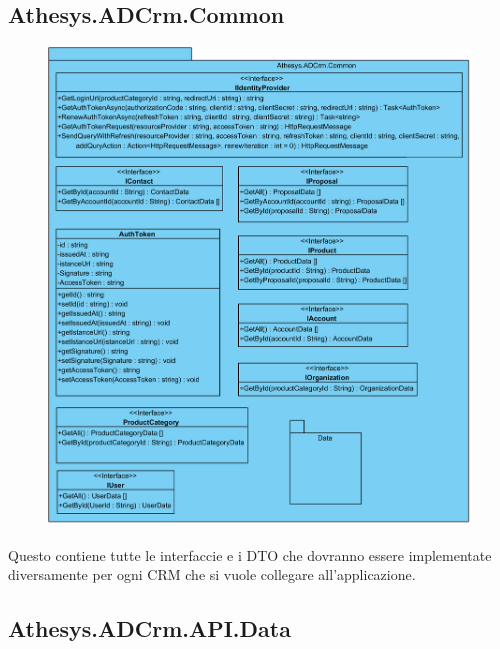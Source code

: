 \subsection{Athesys.ADCrm.Common}

\begin{figure}[H]
	\centering
	\includegraphics[width=\linewidth]{images/modules/common}
	\caption{}
	\label{fig:common}
\end{figure}

Questo  contiene tutte le interfaccie e i DTO che dovranno essere implementate diversamente per ogni CRM che si vuole collegare all'applicazione. 

\subsection{Athesys.ADCrm.API.Data}

